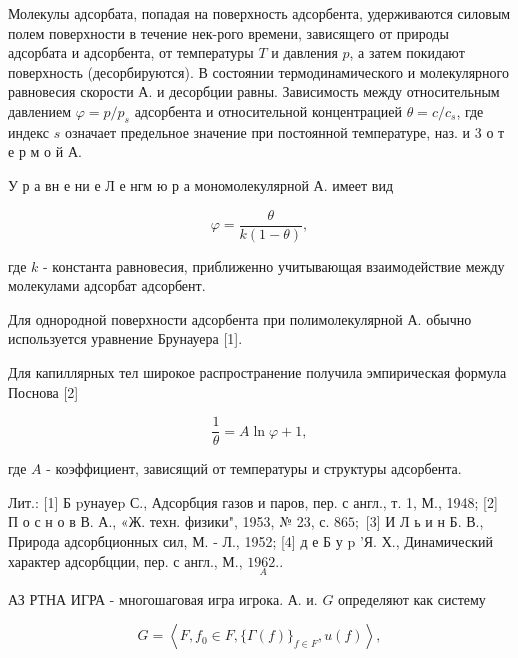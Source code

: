 \documentclass[10pt]{article}
\begin{document}
Молекулы адсорбата, попадая на поверхность адсорбента, удерживаются силовым полем поверхности в течение нек-рого времени, зависящего от природы адсорбата и адсорбента, от температуры $T$ и давления $p$, а затем покидают поверхность (десорбируются). В состоянии термодинамического и молекулярного равновесия скорости А. и десорбции равны. Зависимость между относительным давлением $\varphi=p / p_{s}$ адсорбента и относительной концентрацией $\theta=c / c_{s}$, где индекс $s$ означает предельное значение при постоянной температуре, наз. и 3 о т е р м о й А.



У р а вн е ни е Л е нгм ю р а мономолекулярной А. имеет вид



\[

\varphi=\frac{\theta}{k(1-\theta)},

\]



где $k$ - константа равновесия, приближенно учитывающая взаимодействие между молекулами адсорбат адсорбент.



Для однородной поверхности адсорбента при полимолекулярной А. обычно используется уравнение Брунауера [1].



Для капиллярных тел широкое распространение получила эмпирическая формула Поснова [2]



\[

\frac{1}{\theta}=A \ln \varphi+1,

\]



где $A$ - коэффициент, зависящий от температуры и структуры адсорбента.



Лит.: [1] Б $\mathrm{p} \mathrm{у} \mathrm{н} \mathrm{а} \mathrm{у} \mathrm{е} \mathrm{p}$ С., Адсорбция газов и паров, пер. с англ., т. 1, М., 1948; [2] П о с н о в В. А., «Ж. техн. физики", 1953, № 23, с. $865 ;$ [3] И Л ь и н Б. В., Природа адсорбционных сил, М. - Л., 1952; [4] д е Б у p 'Я. Х., Динамический характер адсорбцции, пер. с англ., М., $\underset{A}{1962 .}$.



АЗ РТНА ИГРА - многошаговая игра игрока. А. и. $G$ определяют как систему



\[

G=\left\langle F, f_{0} \in F,\{\Gamma(f)\}_{f \in F}, u(f)\right\rangle,

\]
\end{document}
